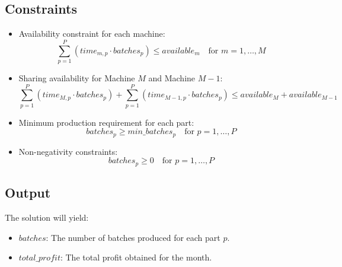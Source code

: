 \documentclass{article}
\begin{document}
\subsection*{Constraints}
\begin{itemize}
    \item Availability constraint for each machine:
    \[
    \sum_{p=1}^{P} (time_{m,p} \cdot batches_{p}) \leq available_{m} \quad \text{for } m = 1, \ldots, M
    \]
    \item Sharing availability for Machine $M$ and Machine $M-1$:
    \[
    \sum_{p=1}^{P} (time_{M,p} \cdot batches_{p}) + \sum_{p=1}^{P} (time_{M-1,p} \cdot batches_{p}) \leq available_{M} + available_{M-1}
    \]
    \item Minimum production requirement for each part:
    \[
    batches_{p} \geq min\_batches_{p} \quad \text{for } p = 1, \ldots, P
    \]
    \item Non-negativity constraints:
    \[
    batches_{p} \geq 0 \quad \text{for } p = 1, \ldots, P
    \]
\end{itemize}

\subsection*{Output}
The solution will yield:
\begin{itemize}
    \item $batches$: The number of batches produced for each part $p$.
    \item $total\_profit$: The total profit obtained for the month.
\end{itemize}
\end{document}
